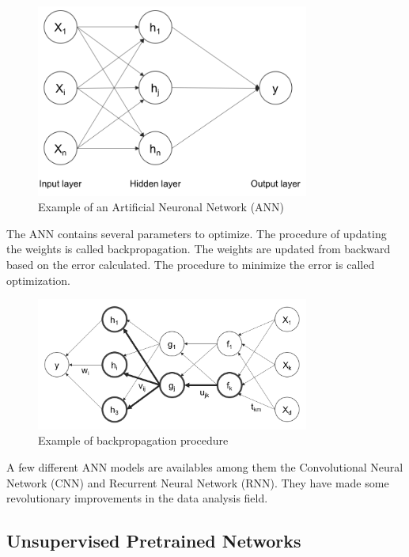 \begin{figure}[H]
\centering
\includegraphics[width=0.8\textwidth]{./figures/ann}
\caption{Example of an Artificial Neuronal Network (ANN) \cite{rajalingappaa}}
\end{figure}
 
The ANN contains several parameters to optimize. The procedure of updating the weights is called backpropagation. The weights are updated from backward based on the error calculated. The procedure to minimize the error is called optimization.

\begin{figure}[H]
\centering
\includegraphics[width=0.8\textwidth]{./figures/backpropagation}
\caption{Example of backpropagation procedure \cite{rajalingappaa}}
\end{figure}

   
A few different ANN models are availables among them the Convolutional Neural Network (CNN) and Recurrent Neural Network (RNN). They have made some revolutionary improvements in the data analysis field. 

\subsection[Unsupervised Pretrained Networks]{Unsupervised Pretrained Networks}

